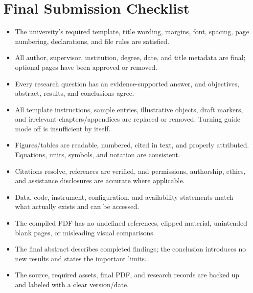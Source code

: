\documentclass[12pt,a4paper,oneside]{report}
\newcommand{\ChecklistItem}{\item[$\square$]}
\begin{document}
\section{Final Submission Checklist}
\begin{itemize}[leftmargin=1.6em]
\ChecklistItem The university's required template, title wording, margins,
font, spacing, page numbering, declarations, and file rules are satisfied.
\ChecklistItem All author, supervisor, institution, degree, date, and title
metadata are final; optional pages have been approved or removed.
\ChecklistItem Every research question has an evidence-supported answer,
and objectives, abstract, results, and conclusions agree.
\ChecklistItem All template instructions, sample entries, illustrative
objects, draft markers, and irrelevant chapters/appendices are replaced
or removed. Turning guide mode off is insufficient by itself.
\ChecklistItem Figures/tables are readable, numbered, cited in text, and
properly attributed. Equations, units, symbols, and notation are consistent.
\ChecklistItem Citations resolve, references are verified, and permissions,
authorship, ethics, and assistance disclosures are accurate where applicable.
\ChecklistItem Data, code, instrument, configuration, and availability
statements match what actually exists and can be accessed.
\ChecklistItem The compiled PDF has no undefined references, clipped
material, unintended blank pages, or misleading visual comparisons.
\ChecklistItem The final abstract describes completed findings; the
conclusion introduces no new results and states the important limits.
\ChecklistItem The source, required assets, final PDF, and research records
are backed up and labeled with a clear version/date.
\end{itemize}
\fi
\end{document}
